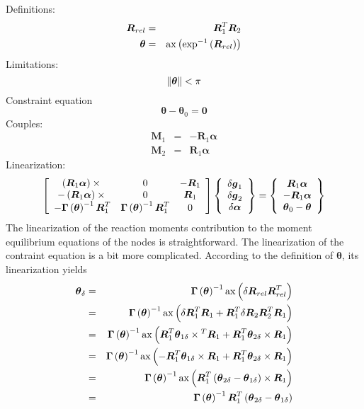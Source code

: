 \documentclass[10pt,dvips]{report}
\newcommand{\T}[1]{\boldsymbol{#1}}
\begin{document}
\noindent
Definitions:
\begin{eqnarray*}
	\T{R}_{rel} & = & \T{R}_1^T \T{R}_2 \\
	\T{\theta} & = & \llk{ax}\plbr{\llk{exp}^{-1}\plbr{\T{R}_{rel}}}
\end{eqnarray*}
Limitations:
\begin{displaymath}
	\nrbr{\T{\theta}} < \pi
\end{displaymath}
Constraint equation 
\begin{displaymath}
	\T{\theta} - \T{\theta}_0 = \T{0}
\end{displaymath}
Couples:
\begin{eqnarray*}
	\T{M}_1 & = & -\T{R}_1 \T{\alpha} \\
	\T{M}_2 & = & \T{R}_1 \T{\alpha}
\end{eqnarray*}
Linearization:
\begin{displaymath}
	\sqbr{\matr{ccc}{
		\plbr{\T{R}_1 \T{\alpha}}\times{} & 0 & -\T{R}_1 \\
		-\plbr{\T{R}_1 \T{\alpha}}\times{} & 0 & \T{R}_1 \\
		-\T{\Gamma}\plbr{\T{\theta}}^{-1} \T{R}_1^T &
			\T{\Gamma}\plbr{\T{\theta}}^{-1} \T{R}_1^T & 0
	}}\cubr{\cvvect{
		\delta\T{g}_1 \\
		\delta\T{g}_2 \\
		\delta\T{\alpha} \\
	}} = \cubr{\cvvect{
		\T{R}_1 \T{\alpha} \\
		-\T{R}_1 \T{\alpha} \\
		\T{\theta}_0 - \T{\theta}
	}}
\end{displaymath}
The linearization of the reaction moments contribution 
to the moment equilibrium equations of the nodes is straightforward.
The linearization of the contraint equation is a bit more complicated.
According to the definition of $\T{\theta}$, its linearization
yields
\begin{eqnarray*}
	\T{\theta}_{\delta}
		& = & \T{\Gamma}\plbr{\T{\theta}}^{-1} 
			\llk{ax}\plbr{\delta\T{R}_{rel} \T{R}_{rel}^T} \\
		& = & \T{\Gamma}\plbr{\T{\theta}}^{-1} \llk{ax}\plbr{
			\delta\T{R}_1^T \T{R}_1
			+ \T{R}_1^T \delta\T{R}_2 \T{R}_2^T \T{R}_1
		} \\
		& = & \T{\Gamma}\plbr{\T{\theta}}^{-1} \llk{ax}\plbr{
			\T{R}_1^T \T{\theta}_{1\delta}\times{}^T \T{R}_1
			+ \T{R}_1^T \T{\theta}_{2\delta}\times{} \T{R}_1
		} \\
		& = & \T{\Gamma}\plbr{\T{\theta}}^{-1} \llk{ax}\plbr{
			- \T{R}_1^T \T{\theta}_{1\delta}\times{} \T{R}_1
			+ \T{R}_1^T \T{\theta}_{2\delta}\times{} \T{R}_1
		} \\
		& = & \T{\Gamma}\plbr{\T{\theta}}^{-1}
			\llk{ax} \plbr{
				\T{R}_1^T \plbr{
					\T{\theta}_{2\delta}
					- \T{\theta}_{1\delta}
				}\times \T{R}_1
			} \\
		& = & \T{\Gamma}\plbr{\T{\theta}}^{-1} \T{R}_1^T \plbr{
			\T{\theta}_{2\delta} - \T{\theta}_{1\delta}
		}
\end{eqnarray*}
\end{document}
